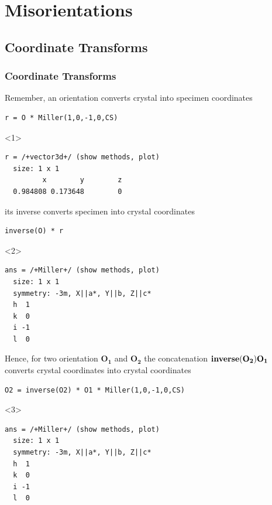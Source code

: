 \documentclass[compress]{beamer}
\begin{document}
\section{Misorientations}

\subsection*{Coordinate Transforms}
\label{sec:orientations}

\begin{frame}[fragile]
  \frametitle{Coordinate Transforms}

  \begin{overlayarea}{\textwidth}{8cm}
  Remember, an orientation converts crystal into specimen
  coordinates
  \begin{lstlisting}[style=input]
r = O * Miller(1,0,-1,0,CS)
\end{lstlisting}
  \begin{onlyenv}<1>
\vspace{-.3cm}\begin{lstlisting}[style=output]
  r = /+vector3d+/ (show methods, plot)
  size: 1 x 1
         x        y        z
  0.984808 0.173648        0
\end{lstlisting}
  \end{onlyenv}

  \pause
  \medskip

  its inverse converts specimen into crystal coordinates
\begin{lstlisting}[style=input]
inverse(O) * r
\end{lstlisting}
  \begin{onlyenv}<2>
\vspace{-.3cm}\begin{lstlisting}[style=output]
ans = /+Miller+/ (show methods, plot)
  size: 1 x 1
  symmetry: -3m, X||a*, Y||b, Z||c*
  h  1
  k  0
  i -1
  l  0
\end{lstlisting}
  \end{onlyenv}

  \pause
  \medskip

  Hence, for two orientation $\mathbf{O_{1}}$ and $\mathbf{O_{2}}$ the
  concatenation $\text{\bf inverse}(\mathbf{O_{2}}) \mathbf{O_{1}}$ converts crystal coordinates into
  crystal coordinates
  \begin{lstlisting}[style=input]
O2 = inverse(O2) * O1 * Miller(1,0,-1,0,CS)
  \end{lstlisting}
  \begin{onlyenv}<3>
\vspace{-.3cm}\begin{lstlisting}[style=output]
ans = /+Miller+/ (show methods, plot)
  size: 1 x 1
  symmetry: -3m, X||a*, Y||b, Z||c*
  h  1
  k  0
  i -1
  l  0
\end{lstlisting}
  \end{onlyenv}

\end{overlayarea}

\end{frame}
\end{document}

